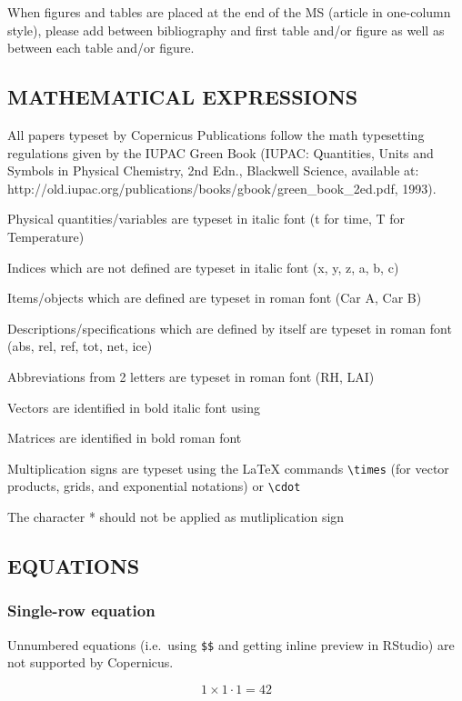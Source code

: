 \documentclass[gmd, manuscript]{copernicus}
\begin{document}
When figures and tables are placed at the end of the MS (article in
one-column style), please add \clearpage between bibliography and first
table and/or figure as well as between each table and/or figure.

\subsection{MATHEMATICAL EXPRESSIONS}

All papers typeset by Copernicus Publications follow the math
typesetting regulations given by the IUPAC Green Book (IUPAC:
Quantities, Units and Symbols in Physical Chemistry, 2nd Edn., Blackwell
Science, available at:
http://old.iupac.org/publications/books/gbook/green\_book\_2ed.pdf,
1993).

Physical quantities/variables are typeset in italic font (t for time, T
for Temperature)

Indices which are not defined are typeset in italic font (x, y, z, a, b,
c)

Items/objects which are defined are typeset in roman font (Car A, Car B)

Descriptions/specifications which are defined by itself are typeset in
roman font (abs, rel, ref, tot, net, ice)

Abbreviations from 2 letters are typeset in roman font (RH, LAI)

Vectors are identified in bold italic font using 

Matrices are identified in bold roman font

Multiplication signs are typeset using the LaTeX commands
\texttt{\textbackslash{}times} (for vector products, grids, and
exponential notations) or \texttt{\textbackslash{}cdot}

The character * should not be applied as mutliplication sign

\subsection{EQUATIONS}

\subsubsection{Single-row equation}

Unnumbered equations (i.e.~using \texttt{\$\$} and getting inline
preview in RStudio) are not supported by Copernicus.

\begin{equation}
1 \times 1 \cdot 1 = 42
\end{equation}
\end{document}
